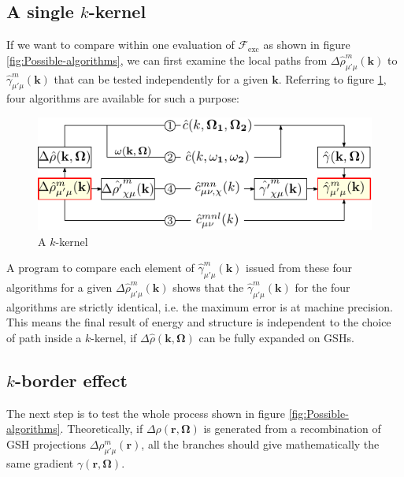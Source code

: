\subsection{A single $k$-kernel\label{subsec:A-single-k-kernel}}

If we want to compare within one evaluation of $\mathcal{F}_{\mathrm{exc}}$
as shown in figure \ref{fig:Possible-algorithms}, we can first
examine the local paths from $\Delta\hat{\rho}_{\mu'\mu}^{m}(\mathbf{k})$
to $\hat{\gamma}_{\mu'\mu}^{m}(\mathbf{k})$ that can be tested independently
for a given $\mathbf{k}$. Referring to figure \ref{fig:k-kernel},
four algorithms are available for such a purpose:

\begin{figure}[h]
\begin{centering}
\includegraphics{_figure/algorithms_q}
\par\end{centering}
\caption{A $k$-kernel\label{fig:k-kernel}}
\end{figure}

A program to compare each element of $\hat{\gamma}_{\mu'\mu}^{m}(\mathbf{k})$
issued from these four algorithms for a given $\Delta\hat{\rho}_{\mu'\mu}^{m}(\mathbf{k})$
shows that the $\hat{\gamma}_{\mu'\mu}^{m}(\mathbf{k})$ for the four
algorithms are strictly identical, i.e. the maximum error is at machine
precision. This means the final result of energy and structure is
independent to the choice of path inside a $k$-kernel, if $\Delta\hat{\rho}(\mathbf{k},\mathbf{\Omega})$
can be fully expanded on \acs{GSH}s.

\subsection{$k$-border effect\label{subsec:k-border-effect}}

The next step is to test the whole process shown in figure \ref{fig:Possible-algorithms}.
Theoretically, if $\Delta\rho(\mathbf{r},\mathbf{\Omega})$ is generated
from a recombination of \acs{GSH} projections $\Delta\rho_{\mu'\mu}^{m}(\mathbf{r})$,
all the branches should give mathematically the same gradient $\gamma(\mathbf{r},\mathbf{\Omega})$. 

